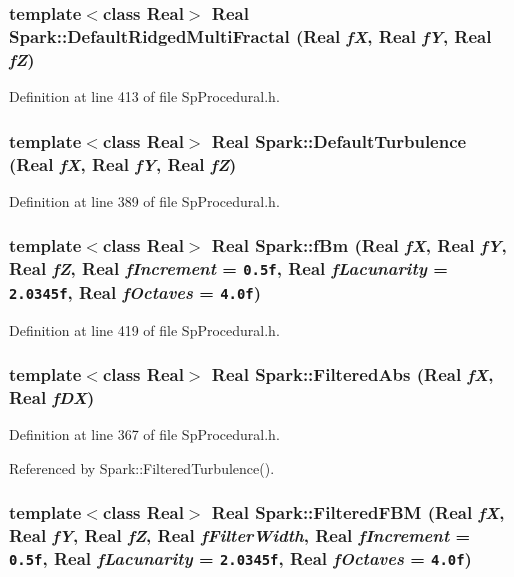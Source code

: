 \subsubsection{\setlength{\rightskip}{0pt plus 5cm}template$<$class Real$>$ Real Spark::Default\-Ridged\-Multi\-Fractal (Real {\em f\-X}, Real {\em f\-Y}, Real {\em f\-Z})}\label{namespaceSpark_a89}


Definition at line 413 of file Sp\-Procedural.h.
\subsubsection{\setlength{\rightskip}{0pt plus 5cm}template$<$class Real$>$ Real Spark::Default\-Turbulence (Real {\em f\-X}, Real {\em f\-Y}, Real {\em f\-Z})}\label{namespaceSpark_a85}


Definition at line 389 of file Sp\-Procedural.h.
\subsubsection{\setlength{\rightskip}{0pt plus 5cm}template$<$class Real$>$ Real Spark::f\-Bm (Real {\em f\-X}, Real {\em f\-Y}, Real {\em f\-Z}, Real {\em f\-Increment} = {\tt 0.5f}, Real {\em f\-Lacunarity} = {\tt 2.0345f}, Real {\em f\-Octaves} = {\tt 4.0f})}\label{namespaceSpark_a90}


Definition at line 419 of file Sp\-Procedural.h.
\subsubsection{\setlength{\rightskip}{0pt plus 5cm}template$<$class Real$>$ Real Spark::Filtered\-Abs (Real {\em f\-X}, Real {\em f\-DX})}\label{namespaceSpark_a106}


Definition at line 367 of file Sp\-Procedural.h.

Referenced by Spark::Filtered\-Turbulence().
\subsubsection{\setlength{\rightskip}{0pt plus 5cm}template$<$class Real$>$ Real Spark::Filtered\-FBM (Real {\em f\-X}, Real {\em f\-Y}, Real {\em f\-Z}, Real {\em f\-Filter\-Width}, Real {\em f\-Increment} = {\tt 0.5f}, Real {\em f\-Lacunarity} = {\tt 2.0345f}, Real {\em f\-Octaves} = {\tt 4.0f})}\label{namespaceSpark_a83}


